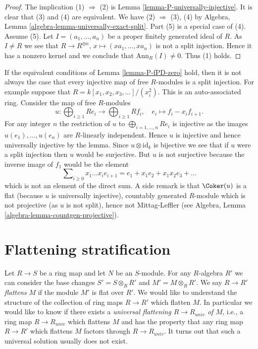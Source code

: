 \begin{proof}
The implication (1) $\Rightarrow$ (2) is
Lemma \ref{lemma-P-universally-injective}.
It is clear that (3) and (4) are equivalent.
We have (2) $\Rightarrow$ (3), (4) by
Algebra, Lemma \ref{algebra-lemma-universally-exact-split}.
Part (5) is a special case of (4).
Assume (5). Let $I = (a_1, \ldots, a_n)$ be a proper finitely generated
ideal of $R$. As $I \not = R$ we see that
$R \to R^{\oplus n}$, $x \mapsto (xa_1, \ldots, xa_n)$
is not a split injection. Hence it has a nonzero kernel and we conclude
that $\text{Ann}_R(I) \not = 0$. Thus (1) holds.
\end{proof}

\begin{example}
\label{example-auto-ass-weird-flat}
If the equivalent conditions of
Lemma \ref{lemma-P-fPD-zero}
hold, then it is not always the case that every injective map of
free $R$-modules is a split injection. For example suppose that
$R = k[x_1, x_2, x_3, \ldots]/(x_i^2)$. This is an auto-associated ring.
Consider the map of free $R$-modules
$$
u :
\bigoplus\nolimits_{i \geq 1} Re_i
\longrightarrow
\bigoplus\nolimits_{i \geq 1} Rf_i, \quad
e_i \longmapsto f_i - x_if_{i + 1}.
$$
For any integer $n$ the restriction of $u$ to
$\bigoplus_{i = 1, \ldots, n} Re_i$ is injective as the images
$u(e_1), \ldots, u(e_n)$ are $R$-linearly independent. Hence
$u$ is injective and hence universally injective by the lemma.
Since $u \otimes \text{id}_k$ is bijective we see that if
$u$ were a split injection then $u$ would be surjective. But $u$ is not
surjective because the inverse image of $f_1$ would be the element
$$
\sum\nolimits_{i \geq 0} x_1 \ldots x_ie_{i + 1} =
e_1 + x_1e_2 + x_1x_2e_3 + \ldots
$$
which is not an element of the direct sum. A side remark is that
$\Coker(u)$ is a flat (because $u$ is universally injective),
countably generated $R$-module which is not projective (as $u$ is not
split), hence not Mittag-Leffler (see
Algebra, Lemma \ref{algebra-lemma-countgen-projective}).
\end{example}









\section{Flattening stratification}
\label{section-flattening}

\noindent
Let $R \to S$ be a ring map and let $N$ be an $S$-module.
For any $R$-algebra $R'$ we can consider the base changes
$S' = S \otimes_R R'$ and $M' = M \otimes_R R'$.
We say $R \to R'$ {\it flattens} $M$ if the module $M'$ is flat over $R'$.
We would like to understand the structure of the collection of ring maps
$R \to R'$ which flatten $M$. In particular we would like to know
if there exists a {\it universal flattening $R \to R_{univ}$ of $M$},
i.e., a ring map $R \to R_{univ}$ which flattens $M$ and has the property
that any ring map $R \to R'$ which flattens $M$ factors through
$R \to R_{univ}$. It turns out that such a universal solution usually
does not exist.

